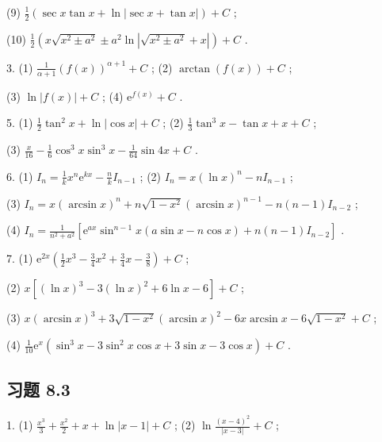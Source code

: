 (9) \(\frac{1}{2}\left( {\sec x\tan x + \ln \left| {\sec x + \tan x}\right| }\right)  + C\) ;

(10) \(\frac{1}{2}\left( {x\sqrt{{x}^{2} \pm  {a}^{2}} \pm  {a}^{2}\ln \left| {\sqrt{{x}^{2} \pm  {a}^{2}} + x}\right| }\right)  + C\) .

3. (1) \(\frac{1}{\alpha  + 1}{\left( f\left( x\right) \right) }^{\alpha  + 1} + C\) ; (2) \(\arctan \left( {f\left( x\right) }\right)  + C\) ;

(3) \(\ln \left| {f\left( x\right) }\right|  + C\) ; (4) \({\mathrm{e}}^{f\left( x\right) } + C\) .

5. (1) \(\frac{1}{2}{\tan }^{2}x + \ln \left| {\cos x}\right|  + C\) ; (2) \(\frac{1}{3}{\tan }^{3}x - \tan x + x + C\) ;

(3) \(\frac{x}{16} - \frac{1}{6}{\cos }^{3}x{\sin }^{3}x - \frac{1}{64}\sin {4x} + C\) .

6. (1) \({I}_{n} = \frac{1}{k}{x}^{n}{\mathrm{e}}^{kx} - \frac{n}{k}{I}_{n - 1}\) ; (2) \({I}_{n} = x{\left( \ln x\right) }^{n} - n{I}_{n - 1}\) ;

(3) \({I}_{n} = x{\left( \arcsin x\right) }^{n} + n\sqrt{1 - {x}^{2}}{\left( \arcsin x\right) }^{n - 1} - n\left( {n - 1}\right) {I}_{n - 2}\) ;

(4) \({I}_{n} = \frac{1}{{n}^{2} + {a}^{2}}\left\lbrack  {{\mathrm{e}}^{ax}{\sin }^{n - 1}x\left( {a\sin x - n\cos x}\right)  + n\left( {n - 1}\right) {I}_{n - 2}}\right\rbrack\) .

7. (1) \({\mathrm{e}}^{2x}\left( {\frac{1}{2}{x}^{3} - \frac{3}{4}{x}^{2} + \frac{3}{4}x - \frac{3}{8}}\right)  + C\) ;

(2) \(x\left\lbrack  {{\left( \ln x\right) }^{3} - 3{\left( \ln x\right) }^{2} + 6\ln x - 6}\right\rbrack   + C\) ;

(3) \(x{\left( \arcsin x\right) }^{3} + 3\sqrt{1 - {x}^{2}}{\left( \arcsin x\right) }^{2} - {6x}\arcsin x - 6\sqrt{1 - {x}^{2}} + C\) ;

(4) \(\frac{1}{10}{\mathrm{e}}^{x}\left( {{\sin }^{3}x - 3{\sin }^{2}x\cos x + 3\sin x - 3\cos x}\right)  + C\) .

\subsection{习题 8.3}

1. (1) \(\frac{{x}^{3}}{3} + \frac{{x}^{2}}{2} + x + \ln \left| {x - 1}\right|  + C\) ; (2) \(\ln \frac{{\left( x - 4\right) }^{2}}{\left| x - 3\right| } + C\) ;

